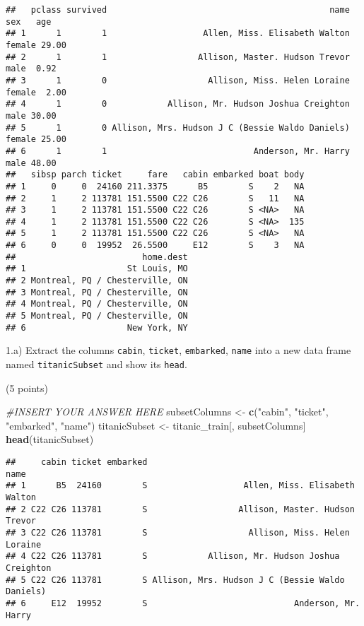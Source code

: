 \documentclass[
]{article}
\newenvironment{Shaded}{\begin{snugshade}}{\end{snugshade}}
\newcommand{\CommentTok}[1]{\textcolor[rgb]{0.56,0.35,0.01}{\textit{#1}}}
\newcommand{\FunctionTok}[1]{\textcolor[rgb]{0.13,0.29,0.53}{\textbf{#1}}}
\newcommand{\NormalTok}[1]{#1}
\newcommand{\OtherTok}[1]{\textcolor[rgb]{0.56,0.35,0.01}{#1}}
\newcommand{\StringTok}[1]{\textcolor[rgb]{0.31,0.60,0.02}{#1}}
\begin{document}
\begin{verbatim}
##   pclass survived                                            name    sex   age
## 1      1        1                   Allen, Miss. Elisabeth Walton female 29.00
## 2      1        1                  Allison, Master. Hudson Trevor   male  0.92
## 3      1        0                    Allison, Miss. Helen Loraine female  2.00
## 4      1        0            Allison, Mr. Hudson Joshua Creighton   male 30.00
## 5      1        0 Allison, Mrs. Hudson J C (Bessie Waldo Daniels) female 25.00
## 6      1        1                             Anderson, Mr. Harry   male 48.00
##   sibsp parch ticket     fare   cabin embarked boat body
## 1     0     0  24160 211.3375      B5        S    2   NA
## 2     1     2 113781 151.5500 C22 C26        S   11   NA
## 3     1     2 113781 151.5500 C22 C26        S <NA>   NA
## 4     1     2 113781 151.5500 C22 C26        S <NA>  135
## 5     1     2 113781 151.5500 C22 C26        S <NA>   NA
## 6     0     0  19952  26.5500     E12        S    3   NA
##                         home.dest
## 1                    St Louis, MO
## 2 Montreal, PQ / Chesterville, ON
## 3 Montreal, PQ / Chesterville, ON
## 4 Montreal, PQ / Chesterville, ON
## 5 Montreal, PQ / Chesterville, ON
## 6                    New York, NY
\end{verbatim}

1.a) Extract the columns \texttt{cabin}, \texttt{ticket},
\texttt{embarked}, \texttt{name} into a new data frame named
\texttt{titanicSubset} and show its \texttt{head}.

(5 points)

\begin{Shaded}
\begin{Highlighting}[]
\CommentTok{\#INSERT YOUR ANSWER HERE}
\NormalTok{subsetColumns }\OtherTok{\textless{}{-}} \FunctionTok{c}\NormalTok{(}\StringTok{"cabin"}\NormalTok{, }\StringTok{"ticket"}\NormalTok{, }\StringTok{"embarked"}\NormalTok{,}
                   \StringTok{"name"}\NormalTok{)}
\NormalTok{titanicSubset }\OtherTok{\textless{}{-}}\NormalTok{ titanic\_train[, subsetColumns]}
\FunctionTok{head}\NormalTok{(titanicSubset)}
\end{Highlighting}
\end{Shaded}

\begin{verbatim}
##     cabin ticket embarked                                            name
## 1      B5  24160        S                   Allen, Miss. Elisabeth Walton
## 2 C22 C26 113781        S                  Allison, Master. Hudson Trevor
## 3 C22 C26 113781        S                    Allison, Miss. Helen Loraine
## 4 C22 C26 113781        S            Allison, Mr. Hudson Joshua Creighton
## 5 C22 C26 113781        S Allison, Mrs. Hudson J C (Bessie Waldo Daniels)
## 6     E12  19952        S                             Anderson, Mr. Harry
\end{verbatim}
\end{document}
